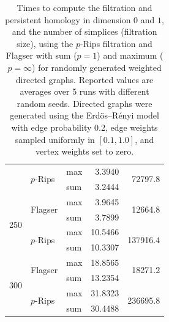 \documentclass[a4paper,11pt]{article}
\theoremstyle{remark}
\begin{document}
\begin{appendices}
\begin{table}[ht]
\begin{tabular}{r l l r r}
 & \multirow{2}{*}{$p$-Rips} & max & 3.3940 & \multirow{2}{*}{72797.8} \\
 &                           & sum & 3.2444 &                         \\
\midrule
\multirow{4}{*}{250}

 & \multirow{2}{*}{Flagser} & max & 3.9645 & \multirow{2}{*}{12664.8} \\
 &                           & sum & 3.7899 &                         \\
 

 & \multirow{2}{*}{$p$-Rips} & max & 10.5466 & \multirow{2}{*}{137916.4} \\
 &                           & sum & 10.3307 &                         \\
\midrule
\multirow{4}{*}{300}

 & \multirow{2}{*}{Flagser} & max & 18.8565 & \multirow{2}{*}{18271.2} \\
 &                           & sum & 13.2354 &                         \\
 

 & \multirow{2}{*}{$p$-Rips} & max & 31.8323 & \multirow{2}{*}{236695.8} \\
 &                           & sum & 30.4488 &                         \\
\bottomrule
\end{tabular}
\caption{%
Times to compute the filtration and persistent homology in dimension $0$ and $1$, and the number of simplices (filtration size), using the $p$-Rips filtration and Flagser with sum ($p=1$) and maximum ($p=\infty$) for randomly generated weighted directed graphs. Reported values are averages over 5 runs with different random seeds. Directed graphs were generated using the Erd\"os--R\'enyi model with edge probability 0.2, edge weights sampled uniformly in $[0.1, 1.0]$, and vertex weights set to zero.}\label{tab:filtration_runtimes}
\end{table}


\end{appendices}
\end{document}
